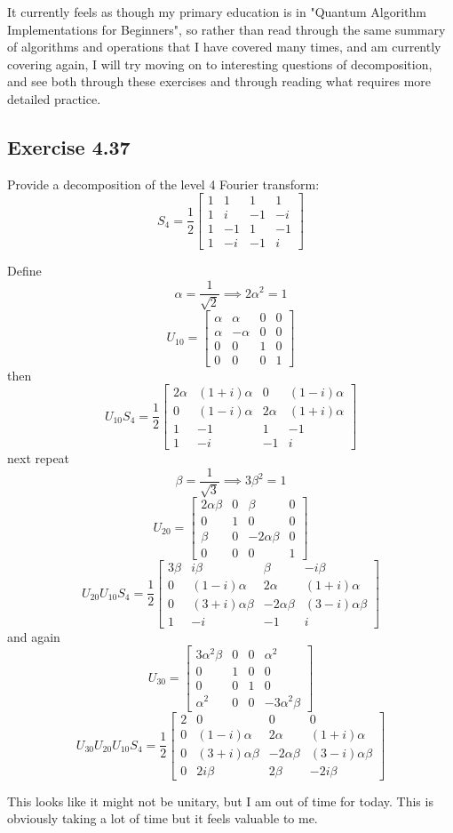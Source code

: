 \documentclass[]{article}
\begin{document}
It currently feels as though my primary education is in "Quantum Algorithm Implementations for Beginners", so rather than read through the same summary of algorithms and operations that I have covered many times, and am currently covering again, I will try moving on to interesting questions of decomposition, and see both through these exercises and through reading what requires more detailed practice.

\subsection{Exercise 4.37}
Provide a decomposition of the level 4 Fourier transform:
\[
S_4 =
\frac{1}{2}
\left[\begin{matrix}
 1& 1& 1& 1\\
 1& i&-1&-i\\
 1&-1& 1&-1\\
 1&-i&-1& i
\end{matrix}\right]
\]

Define
\[\alpha = \frac{1}{\sqrt{2}} \implies 2\alpha^2=1\]
\[
U_{10} = \left[\begin{matrix}
\alpha&\alpha&0&0\\
\alpha&-\alpha&0&0\\
0&0&1&0\\
0&0&0&1
\end{matrix}\right]
\]
then
\[
U_{10}S_4 =
\frac{1}{2}
\left[\begin{matrix}
2\alpha&(1+i)\alpha&0&(1-i)\alpha\\
0&(1-i)\alpha&2\alpha&(1+i)\alpha\\
1&-1&1&-1\\
1&-i&-1&i
\end{matrix}\right]
\]
next repeat
\[\beta = \frac{1}{\sqrt{3}} \implies 3\beta^2=1\]
\[
U_{20} = \left[\begin{matrix}
2\alpha\beta&0&\beta&0\\
0&1&0&0\\
\beta&0&-2\alpha\beta&0\\
0&0&0&1
\end{matrix}\right]
\]
\[
U_{20}U_{10}S_4 =
\frac{1}{2}
\left[\begin{matrix}
3\beta&i\beta&\beta&-i\beta\\
0&(1-i)\alpha&2\alpha&(1+i)\alpha\\
0&(3+i)\alpha\beta&-2\alpha\beta&(3-i)\alpha\beta\\
1&-i&-1&i
\end{matrix}\right]
\]
and again
\[
U_{30} = \left[\begin{matrix}
3\alpha^2\beta&0&0&\alpha^2\\
0&1&0&0\\
0&0&1&0\\
\alpha^2&0&0&-3\alpha^2\beta
\end{matrix}\right]
\]
\[
U_{30}U_{20}U_{10}S_4 =
\frac{1}{2}
\left[\begin{matrix}
2&0&0&0\\
0&(1-i)\alpha&2\alpha&(1+i)\alpha\\
0&(3+i)\alpha\beta&-2\alpha\beta&(3-i)\alpha\beta\\
0&2i\beta&2\beta&-2i\beta
\end{matrix}\right]
\]

This looks like it might not be unitary, but I am out of time for today.
This is obviously taking a lot of time but it feels valuable to me.
\end{document}
